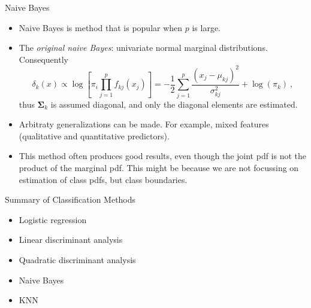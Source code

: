 \documentclass[10pt,ignorenonframetext,]{beamer}
\begin{document}
\begin{frame}

\begin{block}{Naive Bayes}

\begin{itemize}
\item
  Naive Bayes is method that is popular when \(p\) is large.
\item
  The \emph{original naive Bayes}: univariate normal marginal
  distributions. Consequently
  \[\delta_k (x) \propto \log \left[ \pi_i \prod_{j=1}^p f_{kj}(x_j) \right] = - \frac{1}{2} \sum_{j=1}^p \frac{(x_j - \mu_{kj})^2}{\sigma_{kj}^2} + \log(\pi_k) \ , \]
  thus \(\boldsymbol{\Sigma}_k\) is assumed diagonal, and only the
  diagonal elements are estimated.
\item
  Arbitraty generalizations can be made. For example, mixed features
  (qualitative and quantitative predictors).
\item
  This method often produces good results, even though the joint pdf is
  not the product of the marginal pdf. This might be because we are not
  focussing on estimation of class pdfs, but class boundaries.
\end{itemize}

\end{block}

\end{frame}

\begin{frame}

\begin{block}{Summary of Classification Methods}

\begin{itemize}
\item
  Logistic regression
\item
  Linear discriminant analysis
\item
  Quadratic discriminant analysis
\item
  Naive Bayes
\item
  KNN
\end{itemize}

\vspace{2mm}

\end{block}

\end{frame}
\end{document}

